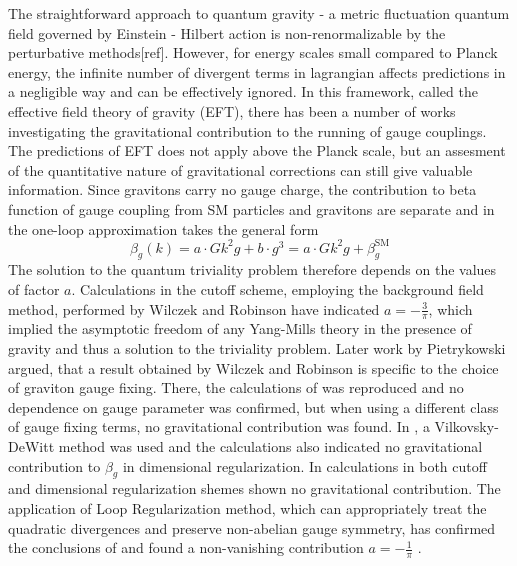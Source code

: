 \documentclass[11pt, a4paper]{article}
\begin{document}
\pagebreak
The straightforward approach to quantum gravity - a metric fluctuation quantum field governed by Einstein - Hilbert action
is non-renormalizable by the perturbative methods[ref]. However, for energy scales small
compared to Planck energy, the infinite number of divergent terms in lagrangian affects predictions in a negligible way and can be effectively ignored.
In this framework, called the effective field theory of gravity (EFT), there has been a number of works investigating
the gravitational contribution to the running of gauge couplings. The predictions of EFT does not apply above
the Planck scale, but an assesment of the quantitative nature of gravitational corrections can still give valuable information.
Since gravitons carry no gauge charge, the contribution to beta function of gauge coupling from SM particles and gravitons are separate
and in the one-loop approximation takes the general form
\begin{equation}
    \beta_g(k) = a \cdot G k^2 g + b \cdot g^3 = a \cdot G k^2 g + \beta_{g}^{\text{SM}}
    \label{betawilczek}
\end{equation}
The solution to the quantum triviality problem therefore depends on the values of factor $a$.
Calculations in the cutoff scheme, employing the background field method, performed by Wilczek and Robinson \cite{wilczek} have indicated
$a = - \frac{3}{\pi} $, which implied the asymptotic freedom of any Yang-Mills theory in the presence of gravity and thus a solution to the triviality problem.
Later work by Pietrykowski \cite{pietrykowski} argued, that a result obtained by Wilczek and Robinson is specific to the choice of graviton gauge fixing.
There, the calculations of \cite{wilczek} was reproduced and no dependence on gauge parameter was confirmed, but when using a different class of gauge fixing terms, no gravitational contribution was found. 
In \cite{toms}, a Vilkovsky-DeWitt method was used and the calculations also indicated no gravitational contribution to $\beta_g$ in dimensional regularization. 
In \cite{absence} calculations in both cutoff and dimensional regularization shemes shown no gravitational contribution.
The application of Loop Regularization method, which can appropriately treat the quadratic divergences and preserve non-abelian gauge symmetry,
has confirmed the conclusions of \cite{wilczek} and found a non-vanishing contribution $a = -\frac{1}{\pi} $ \cite{tang}.
\end{document}
